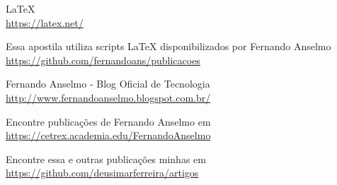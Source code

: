 	LaTeX \\
	\url{https://latex.net/}
	
	Essa apostila utiliza scripts LaTeX\cite{latex} disponibilizados por Fernando Anselmo\cite{fernandoanselmo}  \\
	\url{https://github.com/fernandoans/publicacoes}

	Fernando Anselmo - Blog Oficial de Tecnologia \\
	\url{http://www.fernandoanselmo.blogspot.com.br/}

	Encontre publicações de Fernando Anselmo\cite{fernandoanselmo} em \\
	\url{https://cetrex.academia.edu/FernandoAnselmo}

	Encontre essa e outras publicações minhas em \\
	\url{https://github.com/deusimarferreira/artigos}